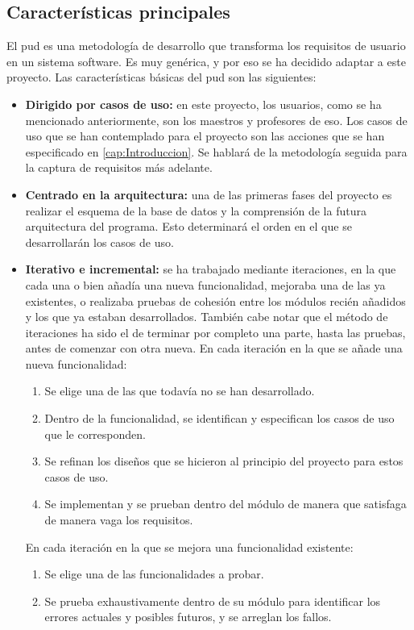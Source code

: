 \subsection{Características principales}
El \gls{pud} es una metodología de desarrollo que transforma los requisitos de usuario en un sistema software. Es muy genérica, y por eso se ha decidido adaptar a este proyecto.
Las características básicas del \gls{pud} son las siguientes:
\begin{itemize}
	\item \textbf{Dirigido por casos de uso:} en este proyecto, los usuarios, como se ha mencionado anteriormente, son los maestros y profesores de \gls{eso}. Los casos de uso que se han contemplado para el proyecto son las acciones que se han especificado en \ref{cap:Introduccion}. Se hablará de la metodología seguida para la captura de requisitos más adelante.
	\item \textbf{Centrado en la arquitectura:} una de las primeras fases del proyecto es realizar el esquema de la base de datos y la comprensión de la futura arquitectura del programa. Esto determinará el orden en el que se desarrollarán los casos de uso.
	\item \textbf{Iterativo e incremental:} se ha trabajado mediante iteraciones, en la que cada una o bien añadía una nueva funcionalidad, mejoraba una de las ya existentes, o realizaba pruebas de cohesión entre los módulos recién añadidos y los que ya estaban desarrollados. También cabe notar que el método de iteraciones ha sido el de terminar por completo una parte, hasta las pruebas, antes de comenzar con otra nueva. En cada iteración en la que se añade una nueva funcionalidad:
	\begin{enumerate}
		\item Se elige una de las que todavía no se han desarrollado.
		\item Dentro de la funcionalidad, se identifican y especifican los casos de uso que le corresponden.
		\item Se refinan los diseños que se hicieron al principio del proyecto para estos casos de uso.
		\item Se implementan y se prueban dentro del módulo de manera que satisfaga de manera vaga los requisitos.
	\end{enumerate}
	
	En cada iteración en la que se mejora una funcionalidad existente:
	\begin{enumerate}
		\item Se elige una de las funcionalidades a probar.
		\item Se prueba exhaustivamente dentro de su módulo para identificar los errores actuales y posibles futuros, y se arreglan los fallos.
	\end{enumerate}
	

\end{itemize}
